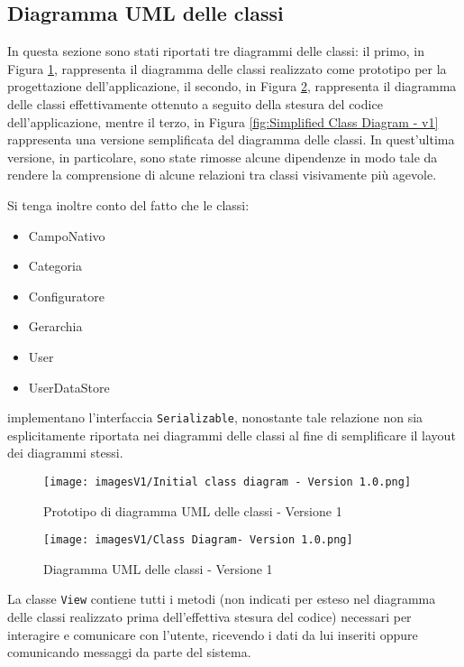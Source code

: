 \newpage
\subsection{Diagramma UML delle classi}
In questa sezione sono stati riportati tre diagrammi delle classi: il primo, in Figura \ref{fig:Initial Class diagram - v1}, rappresenta il diagramma delle classi realizzato come prototipo per la progettazione dell'applicazione, il secondo, in Figura \ref{fig:Class diagram - v1}, rappresenta il diagramma delle classi effettivamente ottenuto a seguito della stesura del codice dell'applicazione, mentre il terzo, in Figura \ref{fig:Simplified Class Diagram - v1} rappresenta una versione semplificata del diagramma delle classi. In quest'ultima versione, in particolare, sono state rimosse alcune dipendenze in modo tale da rendere la comprensione di alcune relazioni tra classi visivamente più agevole.

Si tenga inoltre conto del fatto che le classi:
\begin{itemize}
    \item CampoNativo
    \item Categoria
    \item Configuratore
    \item Gerarchia
    \item User
    \item UserDataStore
\end{itemize}
implementano l'interfaccia \texttt{Serializable}, nonostante tale relazione non sia esplicitamente riportata nei diagrammi delle classi al fine di semplificare il layout dei diagrammi stessi.

\begin{figure}[hb]
    \centering
    \texttt{[image: imagesV1/Initial class diagram - Version 1.0.png]}
    \caption{\label{fig:Initial Class diagram - v1}Prototipo di diagramma UML delle classi - Versione 1}
\end{figure}

\begin{figure}[h!]
    \centering
    \texttt{[image: imagesV1/Class Diagram- Version 1.0.png]}
    \caption{\label{fig:Class diagram - v1}Diagramma UML delle classi - Versione 1}
\end{figure}    

La classe \texttt{View} contiene tutti i metodi (non indicati per esteso nel diagramma delle classi realizzato prima dell'effettiva stesura del codice) necessari per interagire e comunicare con l'utente, ricevendo i dati da lui inseriti oppure comunicando messaggi da parte del sistema.


